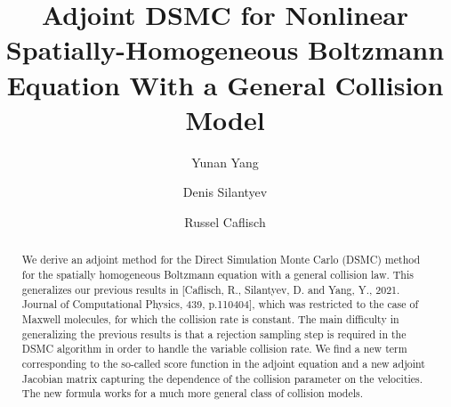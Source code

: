 \documentclass[12pt,nopreprintline]{elsarticle}
\begin{document}
\begin{frontmatter}


\title{Adjoint DSMC for Nonlinear Spatially-Homogeneous Boltzmann Equation With a General Collision Model}


\author[address1]{Yunan Yang}
\author[address2]{Denis Silantyev}
\author[address3]{Russel  Caflisch}
\address[address1]{Institute for Theoretical Studies, ETH Zurich, 8092 Zurich, Switzerland.}
\address[address2]{Department of Mathematics, University of Colorado, Colorado Springs, CO 80918.}
\address[address3]{Courant Institute of Mathematical Sciences, New York University, New York, NY 10012.}

 \begin{abstract} 
We derive an adjoint method for the Direct Simulation Monte Carlo (DSMC) method for the spatially homogeneous Boltzmann equation with a general collision law. This generalizes our previous results in [Caflisch, R., Silantyev, D. and Yang, Y., 2021. Journal of Computational Physics, 439, p.110404], which was restricted to the case of Maxwell molecules, for which the collision rate is constant. The main difficulty in generalizing the previous results is that a rejection sampling step is required in the DSMC algorithm in order to handle the variable collision rate. We find a new term corresponding to the so-called score function in the adjoint equation and a new adjoint Jacobian matrix capturing the dependence of the collision parameter on the velocities. The new formula works for a much more general class of collision models.
 \end{abstract}




\end{frontmatter}
\end{document}
